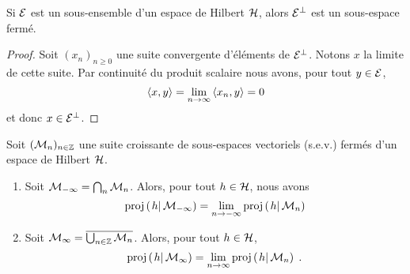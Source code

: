 \begin{theorem}\label{thm:ortho_is_closed}
Si $\cal E$ est un sous-ensemble d'un espace de Hilbert $\cal H$,
alors ${\cal E}^{\perp}$ est un sous-espace ferm\'{e}.
\end{theorem}
\begin{proof}
Soit $(x_n)_{n \geq 0}$ une suite convergente d'\'{e}l\'{e}ments de
${\cal E}^{\perp}$. Notons $x$ la limite de cette suite. Par
continuit\'{e} du produit scalaire nous avons, pour tout $y\in \mathcal{E}$,
\[
\left\langle x, y \right\rangle = \lim_{n \rightarrow \infty} \left\langle x_n, y \right\rangle = 0
\]
et donc $x \in \mathcal{E}^\perp$.

\end{proof}

\begin{theorem}
Soit $(\mathcal{M}_n)_{n\in\mathbb{Z}}$ une suite croissante
de sous-espaces vectoriels (s.e.v.) ferm\'{e}s d'un espace de
Hilbert $\mathcal{H}$.
\begin{enumerate}[label=\emph{\alph*})]
   \item \label{it:intersection_hilbert}
Soit $\mathcal{M}_{-\infty} = \bigcap_n \mathcal{M}_n$. Alors,
pour tout $h \in \mathcal{H}$, nous avons
\[
\proj{h}{\cM_{-\infty}}= \lim_{n \rightarrow - \infty} \proj{h}{\cM_n}
\]
   \item \label{it:union_fermee_hilbert}
Soit $\mathcal{M}_\infty = \overline{\bigcup_{n \in \mathbb{Z}} \mathcal{M}_n}$.
Alors, pour tout $h \in \mathcal{H}$,
\[
\proj{h}{\cM_\infty}= \limn \proj{h}{\cM_n} \eqsp.
\]
\end{enumerate}
\end{theorem}
